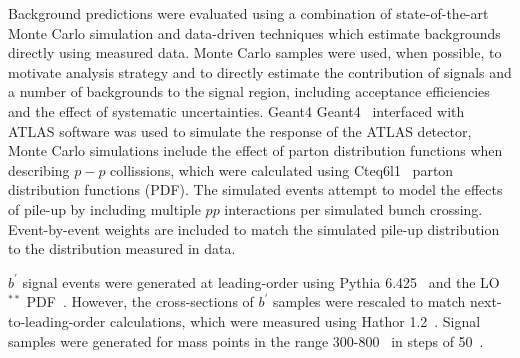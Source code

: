 Background predictions were evaluated using a combination of state-of-the-art Monte Carlo simulation and data-driven techniques which estimate backgrounds directly using measured data.
Monte Carlo samples were used, when possible, to motivate analysis strategy and to directly estimate the contribution of signals and a number of backgrounds to the signal region, including acceptance efficiencies and the effect of systematic uncertainties.
Geant4 {\sc Geant4}~\cite{Agostinelli:2002hh} interfaced with ATLAS software was used to simulate the response of the ATLAS detector,
Monte Carlo simulations include the effect of parton distribution functions when describing $p-p$ collissions, which were calculated using {\sc Cteq6l1}~\cite{Pumplin:2002vw} parton distribution functions (PDF).
The simulated events attempt to model the effects of pile-up by including multiple $pp$ interactions per simulated bunch crossing.
Event-by-event weights are included to match the simulated pile-up distribution to the distribution measured in data.


$b^\prime$ signal events were generated at leading-order using {\sc Pythia 6.425}~\cite{PYTHIA6.4} and the LO$^{**}$ PDF~\cite{Sherstnev:2008dm}.
However, the cross-sections of $b^\prime$ samples were rescaled to match next-to-leading-order calculations, which were measured using {\sc Hathor} 1.2~\cite{Aliev:2010zk}.
Signal samples were generated for mass points in the range 300-800~\GeV{} in steps of 50~\GeV{}.


